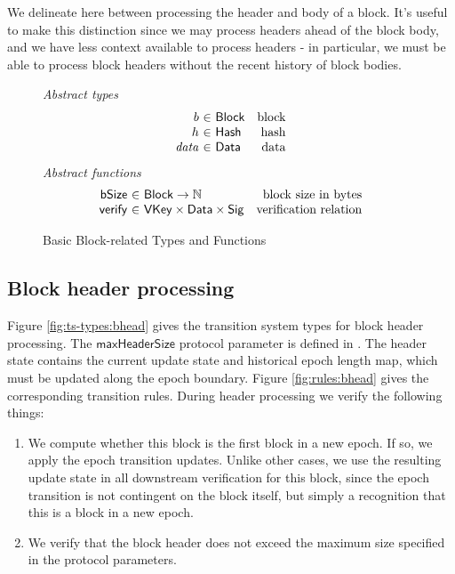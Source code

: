 \documentclass[11pt,a4paper]{article}
\newcommand{\var}[1]{\mathit{#1}}
\newcommand{\fun}[1]{\mathsf{#1}}
\newcommand{\type}[1]{\mathsf{#1}}
\newcommand{\pp}[1]{\mathsf{#1}}
\newcommand{\totalf}{\to}
\newcommand{\Hash}{\type{Hash}}  %
\newcommand{\Block}{\type{Block}}
\newcommand{\VKey}{\type{VKey}}
\newcommand{\Sig}{\type{Sig}}
\newcommand{\Data}{\type{Data}}
\newcommand{\maxheadersize}{\pp{maxHeaderSize}}
\newcommand{\bsizename}{bSize}
\newcommand{\verifyname}{verify}
\begin{document}
We delineate here between processing the header and body of a block. It's useful
to make this distinction since we may process headers ahead of the
block body, and we have less context available to process headers - in
particular, we must be able to process block headers without the recent history
of block bodies.

\begin{figure}[ht]
  \emph{Abstract types}
  \begin{equation*}
    \begin{array}{r@{~\in~}lr}
      b & \Block & \text{block} \\
      h & \Hash   & \text{hash} \\
      \var{data} & \Data    & \text{data}
    \end{array}
  \end{equation*}
  \emph{Abstract functions}
  \begin{equation*}
    \begin{array}{r@{~\in~}lr}
      \fun{\bsizename} & \Block \totalf \mathbb{N} & \text{block size in bytes} \\
      \fun{\verifyname} & \VKey \times \Data \times \Sig & \text{verification relation} \\
    \end{array}
  \end{equation*}
  \caption{Basic Block-related Types and Functions}
  \label{fig:block-defs}
\end{figure}

\subsection{Block header processing}

Figure \ref{fig:ts-types:bhead} gives the transition system types for block
header processing. The $\maxheadersize{}$ protocol parameter is defined in
\cite{byron_ledger_spec}. The header state contains the current update state
and historical epoch length map, which must be updated along the epoch
boundary. Figure \ref{fig:rules:bhead} gives the corresponding transition
rules. During header processing we verify the following things:

\begin{enumerate}
  \item We compute whether this block is the first block in a new epoch.
    If so, we apply the epoch transition updates. Unlike other cases, we use the
    resulting update state in all downstream verification for this block, since
    the epoch transition is not contingent on the block itself, but simply a
    recognition that this is a block in a new epoch.
  \item We verify that the block header does not exceed the maximum size
    specified in the protocol parameters.
\end{enumerate}
\end{document}
